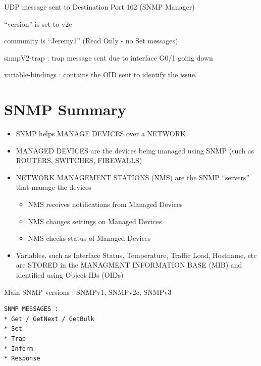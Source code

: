 UDP message sent to Destination Port 162 (SNMP Manager)

``version'' is set to v2c

community is ``Jeremy1'' (Read Only - no Set messages)

snmpV2-trap : trap message sent due to interface G0/1 going down

variable-bindings : contains the OID sent to identify the issue.

\section{SNMP Summary}\label{snmp-summary}

\begin{itemize}
\tightlist
\item
  SNMP helps MANAGE DEVICES over a NETWORK
\item
  MANAGED DEVICES are the devices being managed using SNMP (such as
  ROUTERS, SWITCHES, FIREWALLS)
\item
  NETWORK MANAGEMENT STATIONS (NMS) are the SNMP ``servers'' that manage
  the devices

  \begin{itemize}
  \tightlist
  \item
    NMS receives notifications from Managed Devices
  \item
    NMS changes settings on Managed Devices
  \item
    NMS checks status of Managed Devices
  \end{itemize}
\item
  Variables, such as Interface Status, Temperature, Traffic Load,
  Hostname, etc are STORED in the MANAGMENT INFORMATION BASE (MIB) and
  identified using Object IDs (OIDs)
\end{itemize}

Main SNMP versions : SNMPv1, SNMPv2c, SNMPv3

\begin{lstlisting}
SNMP MESSAGES :
* Get / GetNext / GetBulk
* Set
* Trap
* Inform
* Response
\end{lstlisting}

